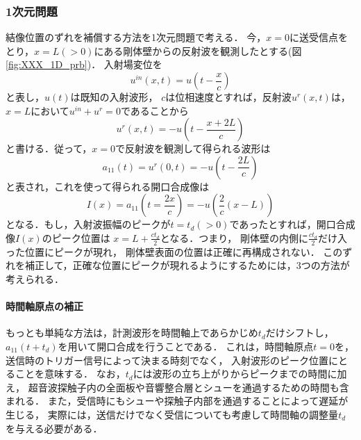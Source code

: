 \subsubsection{1次元問題}
結像位置のずれを補償する方法を1次元問題で考える．
今，$x=0$に送受信点をとり，$x=L(>0)$にある剛体壁からの反射波を観測したとする(図\ref{fig:XXX_1D_prb})．
入射場変位を
\begin{equation}
	u^{in}(x,t)=u\left(t-\frac{x}{c}\right)
	\label{eqn:XXX_uin_1D}
\end{equation}
と表し，$u(t)$は既知の入射波形，
$c$は位相速度とすれば，反射波$u^{r}(x,t)$は，$x=L$において$u^{in}+u^{r}=0$であることから
\begin{equation}
	u^{r}(x,t)=-u\left(t-\frac{x+2L}{c}\right)
	\label{eqn:XXX_ur_1D}
\end{equation}
と書ける．従って，$x=0$で反射波を観測して得られる波形は
\begin{equation}
	a_{11}(t)=u^{r}(0,t)=-u\left( t-\frac{2L}{c}\right)
	\label{eqn:XXX_12}
\end{equation}
と表され，これを使って得られる開口合成像は
\begin{equation}
	I(x)=
	a_{11}\left(t=\frac{2x}{c}\right)
	=
	-u\left(\frac{2}{c}(x-L)\right)
	\label{eqn:XXX_13}
\end{equation}
となる．もし，入射波振幅のピークが$t=t_d(>0)$であったとすれば，開口合成像$I(x)$のピーク位置は
$x=L+\frac{ct_d}{2}$となる．つまり，
剛体壁の内側に$\frac{ct_d}{2}$だけ入った位置にピークが現れ，
剛体壁表面の位置は正確に再構成されない．
このずれを補正して，正確な位置にピークが現れるようにするためには，3つの方法が考えられる．
\paragraph{時間軸原点の補正}
もっとも単純な方法は，計測波形を時間軸上であらかじめ$t_d$だけシフトし，
$a_{11}(t+t_d)$を用いて開口合成を行うことである．
これは，時間軸原点$t=0$を，送信時のトリガー信号によって決まる時刻でなく，
入射波形のピーク位置にとることを意味する．
なお，$t_d$には波形の立ち上がりからピークまでの時間に加え，
超音波探触子内の全面板や音響整合層とシューを通過するための時間も含まれる．
また，受信時にもシューや探触子内部を通過することによって遅延が生じる，
実際には，送信だけでなく受信についても考慮して時間軸の調整量$t_d$を与える必要がある．
